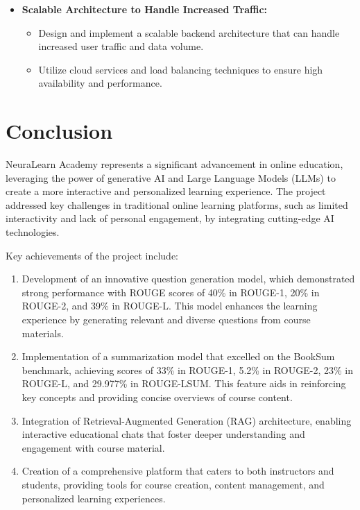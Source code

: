 \begin{itemize}
    \item \textbf{Scalable Architecture to Handle Increased Traffic:}
    \begin{itemize}
        \item Design and implement a scalable backend architecture that can handle increased user traffic and data volume.
        \item Utilize cloud services and load balancing techniques to ensure high availability and performance.
    \end{itemize}
\end{itemize}

\newpage
\section{Conclusion}

NeuraLearn Academy represents a significant advancement in online education, leveraging the power of generative AI and Large Language Models (LLMs) to create a more interactive and personalized learning experience. The project addressed key challenges in traditional online learning platforms, such as limited interactivity and lack of personal engagement, by integrating cutting-edge AI technologies.

Key achievements of the project include:

\begin{enumerate}
    \item Development of an innovative question generation model, which demonstrated strong performance with ROUGE scores of 40\% in ROUGE-1, 20\% in ROUGE-2, and 39\% in ROUGE-L. This model enhances the learning experience by generating relevant and diverse questions from course materials.
    
    \item Implementation of a summarization model that excelled on the BookSum benchmark, achieving scores of 33\% in ROUGE-1, 5.2\% in ROUGE-2, 23\% in ROUGE-L, and 29.977\% in ROUGE-LSUM. This feature aids in reinforcing key concepts and providing concise overviews of course content.
    
    \item Integration of Retrieval-Augmented Generation (RAG) architecture, enabling interactive educational chats that foster deeper understanding and engagement with course material.
    
    \item Creation of a comprehensive platform that caters to both instructors and students, providing tools for course creation, content management, and personalized learning experiences.
\end{enumerate}

